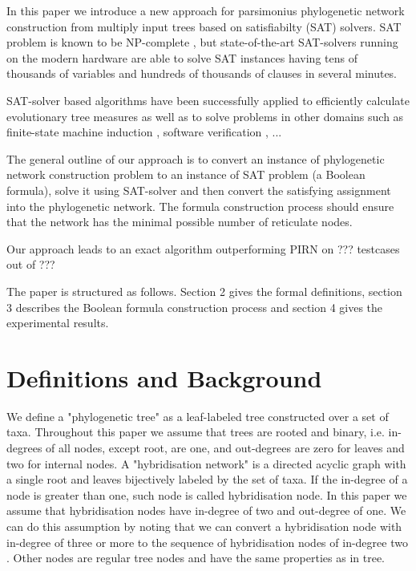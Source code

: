 \documentclass[runningheads, envcountsame, a4paper]{llncs}
\begin{document}
In this paper we introduce a new approach for parsimonius
phylogenetic network construction from multiply input trees based on satisfiabilty (SAT) solvers.
SAT problem is known to be NP-complete \cite{bordewich2007computing}, but state-of-the-art SAT-solvers running on the modern hardware 
are able to solve SAT instances having tens of thousands of variables and hundreds of thousands of clauses in several minutes.

SAT-solver based algorithms have been successfully applied to efficiently calculate evolutionary tree measures \cite{bonet2009efficiently}
as well as to solve problems in other domains such as
finite-state machine induction \cite{heule2010exact}, software verification \cite{}, ...

The general outline of our approach is to convert an instance of phylogenetic network construction 
problem to an instance of SAT problem (a Boolean formula), solve it using SAT-solver and then convert 
the satisfying assignment into the phylogenetic network. The formula construction process should ensure that
the network has the minimal possible number of reticulate nodes.

Our approach leads to an exact algorithm outperforming PIRN on ??? testcases out of ???

The paper is structured as follows. Section 2 gives the formal definitions, section 3 describes the Boolean formula
construction process and section 4 gives the experimental results.

\section{Definitions and Background}

We define a "phylogenetic tree" as a leaf-labeled tree constructed over a set of taxa. Throughout this paper we assume that trees are rooted and binary, i.e. in-degrees of all nodes, except root, are one, and out-degrees are zero for leaves and two for internal nodes. A "hybridisation network" is a directed acyclic graph with a single root and leaves bijectively labeled by the set of taxa. If the in-degree of a node is greater than one, such node is called hybridisation node. In this paper we assume that hybridisation nodes have in-degree of two and out-degree of one. We can do this assumption by noting that we can convert a hybridisation node with in-degree of three or more to the sequence of hybridisation nodes of in-degree two \cite{wu2010close}. Other nodes are regular tree nodes and have the same properties as in tree.
\end{document}
